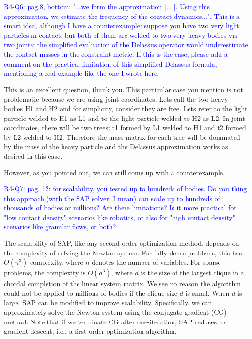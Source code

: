 \vspace{5mm}

\textcolor{blue}{R4-Q6: pag.8, bottom: "...we form the approximation [....].
Using this approximation, we estimate the frequency of the contact dynamics...".
This is a smart idea, although I have a counterexample: suppose you have two
very light particles in contact, but both of them are welded to two very heavy
bodies via two joints: the simplified evaluation of the Delassus operator would
underestimate the contact masses in the constraint metric. If this is the case,
please add a comment on the practical limitation of this simplified Delassus
formula, mentioning a real example like the one I wrote here.}

This is an excellent question, thank you. This particular case you mention is
not problematic because we are using joint coordinates. Lets call the two heavy
bodies H1 and H2 and for simplicity, consider they are free. Lets refer to the
light particle welded to H1 as L1 and to the light particle welded to H2 as L2.
In joint coordinates, there will be two trees: t1 formed by L1 welded to H1 and
t2 formed by L2 welded to H2. Therefore the mass matrix for each tree will be
dominated by the mass of the heavy particle and the Delassus approximation works
as desired in this case.

However, as you pointed out, we can still come up with a counterexample. 


\vspace{5mm}
\textcolor{blue}{R4-Q7: pag. 12: for scalability, you tested up to hundreds of
bodies. Do you thing this approach (with the SAP solver, I mean) can scale up to
hundreds of thousands of bodies or millions? Are there limitations? Is it more
practical for "low contact density" scenarios like robotics, or also for "high
contact density" scenarios like granular flows, or both?}

The scalability of SAP, like any second-order optimization method, depends
on the complexity of solving the Newton system. For fully dense problems,
this has $O(n^3)$ complexity, where $n$ denotes the number of variables. 
For sparse problems, the complexity is $O(d^3)$, where
$d$ is the size of the largest clique in a chordal completion of the 
linear system matrix.  We see no reason the algorithm could not
be applied to millions of bodies if the clique size $d$ is small.  When $d$ is
large, SAP can be modified to improve scalability. Specifically, we can
approximately solve the Newton system using the conjugate-gradient (CG) method.
Note that if we terminate CG after one-iteration, SAP reduces to gradient
descent, i.e., a first-order optimization algorithm.

